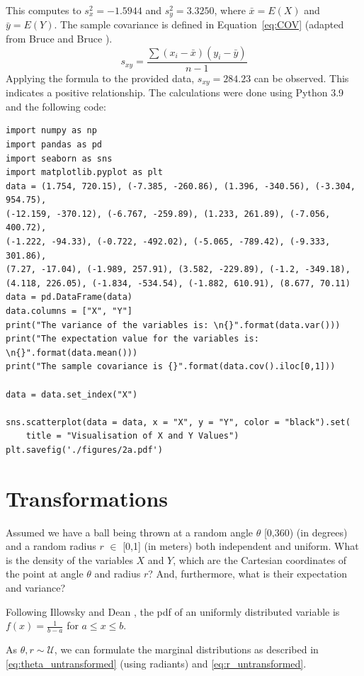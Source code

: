 This computes to $s^2_x = -1.5944$ and $s^2_y = 3.3250$, where $\bar{x} = E(X)$ and $\bar{y} = E(Y)$.
The sample covariance is defined in Equation~\eqref{eq:COV} (adapted from Bruce and Bruce \cite{bruce2017practical}).
\begin{equation}  s_{xy} = \frac{\sum(x_{i}-\bar{x})(y_{i}-\bar{y})}{n-1}
\label{eq:COV}
\end{equation}
Applying the formula to the provided data, $s_{xy} = 284.23$ can be observed. This indicates a positive relationship.
The calculations were done using Python 3.9 and the following code:
\begin{verbatim}
import numpy as np
import pandas as pd
import seaborn as sns
import matplotlib.pyplot as plt
data = (1.754, 720.15), (-7.385, -260.86), (1.396, -340.56), (-3.304, 954.75),
(-12.159, -370.12), (-6.767, -259.89), (1.233, 261.89), (-7.056, 400.72), 
(-1.222, -94.33), (-0.722, -492.02), (-5.065, -789.42), (-9.333, 301.86),
(7.27, -17.04), (-1.989, 257.91), (3.582, -229.89), (-1.2, -349.18), 
(4.118, 226.05), (-1.834, -534.54), (-1.882, 610.91), (8.677, 70.11)
data = pd.DataFrame(data)
data.columns = ["X", "Y"]
print("The variance of the variables is: \n{}".format(data.var()))
print("The expectation value for the variables is: \n{}".format(data.mean()))
print("The sample covariance is {}".format(data.cov().iloc[0,1]))

data = data.set_index("X")

sns.scatterplot(data = data, x = "X", y = "Y", color = "black").set(
    title = "Visualisation of X and Y Values")
plt.savefig('./figures/2a.pdf')
\end{verbatim}


\section{Transformations}
Assumed we have a ball being thrown at a random angle $\theta$ [0,360) (in degrees) and a random radius $r$ $\in$ [0,1] (in meters) both independent and uniform. What is the density of the variables $X$ and $Y$, which are the Cartesian coordinates of the point at angle $\theta$ and radius $r$? And, furthermore, what is their expectation and variance?

Following Illowsky and Dean \cite[Chapter~5.2]{illowsky2018introductory}, the pdf of an uniformly distributed variable is $f(x) = \frac{1}{b-a}$ for $a \leq x \leq b$. 

As $\theta,r \sim \mathcal{U}$, we can formulate the marginal distributions as described in \eqref{eq:theta_untransformed} (using radiants) and \eqref{eq:r_untransformed}.

